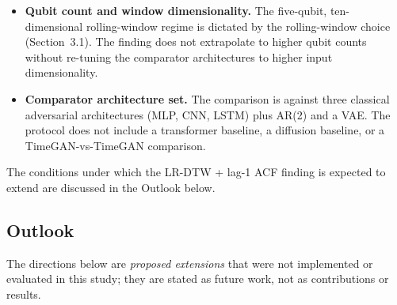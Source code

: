 \documentclass[12pt,twocolumn]{article}
\begin{document}
\begin{itemize}[nosep, leftmargin=*]
    reported with explicit n=5 power caveats and per-seed overlap is
    acknowledged where it occurs (Section~4.1).
  \item \textbf{Qubit count and window dimensionality.} The five-qubit,
    ten-dimensional rolling-window regime is dictated by the
    rolling-window choice (Section~3.1). The finding does not extrapolate
    to higher qubit counts without re-tuning the comparator architectures
    to higher input dimensionality.
  \item \textbf{Comparator architecture set.} The comparison is against
    three classical adversarial architectures (MLP, CNN, LSTM) plus
    AR(2) and a VAE. The protocol does not include a transformer
    baseline, a diffusion baseline, or a TimeGAN-vs-TimeGAN comparison.
\end{itemize}
The conditions under which the LR-DTW + lag-1 ACF finding is expected to
extend are discussed in the Outlook below.

\subsection*{Outlook}

The directions below are \emph{proposed extensions} that were not implemented or evaluated in this study; they are stated as future work, not as contributions or results.
\end{document}
